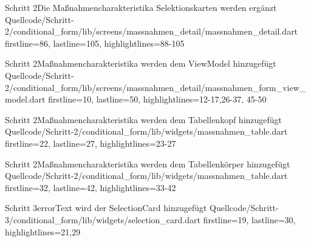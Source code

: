 \begin{alexlistingzwei}{Schritt 2}{Die Maßnahmencharakteristika Selektionskarten werden ergänzt}
  {Quellcode/Schritt-2/conditional_form/lib/screens/massnahmen_detail/massnahmen_detail.dart}
  {firstline=86, lastline=105, highlightlines={88-105}}
  \label{lst:Schritt2MaßnahmencharakteristikaSelektionskartenWerdenErgaenzt}
\end{alexlistingzwei}




\begin{alexlistingzwei}{Schritt 2}{Maßnahmencharakteristika werden dem ViewModel hinzugefügt}
  {Quellcode/Schritt-2/conditional_form/lib/screens/massnahmen_detail/massnahmen_form_view_model.dart}
  {firstline=10, lastline=50, highlightlines={12-17,26-37, 45-50}}
  \label{lst:Schritt2MaßnahmencharakteristikaWerdenDemViewModelHinzugefuegt}
\end{alexlistingzwei}






\begin{alexlistingzwei}{Schritt 2}{Maßnahmencharakteristika werden dem Tabellenkopf hinzugefügt}
  {Quellcode/Schritt-2/conditional_form/lib/widgets/massnahmen_table.dart}
  {firstline=22, lastline=27, highlightlines={23-27}}
  \label{lst:Schritt2MaßnahmencharakteristikaEerdenDemTabellenkopfHinzugefuegt}
\end{alexlistingzwei}


\begin{alexlistingzwei}{Schritt 2}{Maßnahmencharakteristika werden dem Tabellenkörper hinzugefügt}
  {Quellcode/Schritt-2/conditional_form/lib/widgets/massnahmen_table.dart}
  {firstline=32, lastline=42, highlightlines={33-42}}
  \label{lst:Schritt2MaßnahmencharakteristikaWerdenDemTabellenkoerperHinzugefuegt}
\end{alexlistingzwei}


\begin{alexlistingzwei}{Schritt 3}{errorText wird der SelectionCard hinzugefügt}
  {Quellcode/Schritt-3/conditional_form/lib/widgets/selection_card.dart}
  {firstline=19, lastline=30, highlightlines={21,29}}
  \label{lst:Schritt3DieMassnahmencharakteristikaSelektionskartenWerdenergaenzt}
\end{alexlistingzwei}